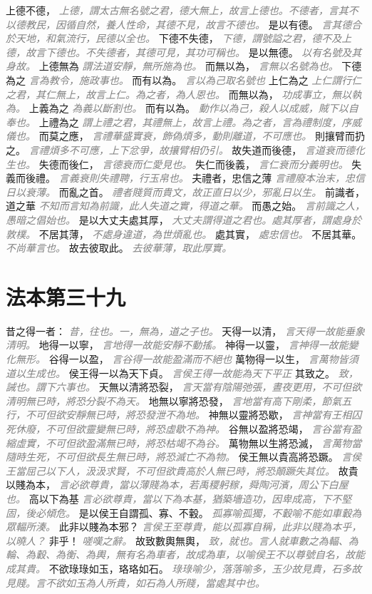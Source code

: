 \documentclass[a4paper,zihao=-4,oneside,landscape,UTF8]{ctexart}
\newcommand{\zhushi}[1]{\scriptsize{\textit{\textcolor{gray}{#1}}}\normalsize}
\begin{document}
上德不德，
\zhushi{上德，謂太古無名號之君，德大無上，故言上德也。不德者，言其不以德教民，因循自然，養人性命，其德不見，故言不德也。}
是以有德。
\zhushi{言其德合於天地，和氣流行，民德以全也。}
下德不失德，
\zhushi{下德，謂號謚之君，德不及上德，故言下德也。不失德者，其德可見，其功可稱也。}
是以無德。
\zhushi{以有名號及其身故。}
上德無為
\zhushi{謂法道安靜，無所施為也。}
而無以為，
\zhushi{言無以名號為也。}
下德為之
\zhushi{言為教令，施政事也。}
而有以為。
\zhushi{言以為己取名號也}
上仁為之
\zhushi{上仁謂行仁之君，其仁無上，故言上仁。為之者，為人恩也。}
而無以為，
\zhushi{功成事立，無以執為。}
上義為之
\zhushi{為義以斷割也。}
而有以為。
\zhushi{動作以為己，殺人以成威，賊下以自奉也。}
上禮為之
\zhushi{謂上禮之君，其禮無上，故言上禮。為之者，言為禮制度，序威儀也。}
而莫之應，
\zhushi{言禮華盛實衰，飾偽煩多，動則離道，不可應也。}
則攘臂而扔之。
\zhushi{言禮煩多不可應，上下忿爭，故攘臂相仍引。}
故失道而後德，
\zhushi{言道衰而德化生也。}
失德而後仁，
\zhushi{言德衰而仁愛見也。}
失仁而後義，
\zhushi{言仁衰而分義明也。}
失義而後禮。
\zhushi{言義衰則失禮聘，行玉帛也。}
夫禮者，忠信之薄
\zhushi{言禮廢本治末，忠信日以衰薄。}
而亂之首。
\zhushi{禮者賤質而貴文，故正直日以少，邪亂日以生。}
前識者，道之華
\zhushi{不知而言知為前識，此人失道之實，得道之華。}
而愚之始。
\zhushi{言前識之人，愚暗之倡始也。}
是以大丈夫處其厚，
\zhushi{大丈夫謂得道之君也。處其厚者，謂處身於敦樸。}
不居其薄，
\zhushi{不處身違道，為世煩亂也。}
處其實，
\zhushi{處忠信也。}
不居其華。
\zhushi{不尚華言也。}
故去彼取此。
\zhushi{去彼華薄，取此厚實。}


\section{法本第三十九}


昔之得一者：
\zhushi{昔，往也。一，無為，道之子也。}
天得一以清，
\zhushi{言天得一故能垂象清明。}
地得一以寧，
\zhushi{言地得一故能安靜不動搖。}
神得一以靈，
\zhushi{言神得一故能變化無形。}
谷得一以盈，
\zhushi{言谷得一故能盈滿而不絕也}
萬物得一以生，
\zhushi{言萬物皆須道以生成也。}
侯王得一以為天下貞。
\zhushi{言侯王得一故能為天下平正}
其致之。
\zhushi{致，誡也。謂下六事也。}
天無以清將恐裂，
\zhushi{言天當有陰陽弛張，晝夜更用，不可但欲清明無已時，將恐分裂不為天。}
地無以寧將恐發，
\zhushi{言地當有高下剛柔，節氣五行，不可但欲安靜無已時，將恐發泄不為地。}
神無以靈將恐歇，
\zhushi{言神當有王相囚死休廢，不可但欲靈變無已時，將恐虛歇不為神。}
谷無以盈將恐竭，
\zhushi{言谷當有盈縮虛實，不可但欲盈滿無已時，將恐枯竭不為谷。}
萬物無以生將恐滅，
\zhushi{言萬物當隨時生死，不可但欲長生無已時，將恐滅亡不為物。}
侯王無以貴高將恐蹶。
\zhushi{言侯王當屈己以下人，汲汲求賢，不可但欲貴高於人無已時，將恐顛蹶失其位。}
故貴以賤為本，
\zhushi{言必欲尊貴，當以薄賤為本，若禹稷躬稼，舜陶河濱，周公下白屋也。}
高以下為基
\zhushi{言必欲尊貴，當以下為本基，猶築墻造功，因卑成高，下不堅固，後必傾危。}
是以侯王自謂孤、寡、不轂。
\zhushi{孤寡喻孤獨，不轂喻不能如車轂為眾輻所湊。}
此非以賤為本邪？
\zhushi{言侯王至尊貴，能以孤寡自稱，此非以賤為本乎，以曉人？}
非乎！
\zhushi{嗟嘆之辭。}
故致數輿無輿，
\zhushi{致，就也。言人就車數之為輻、為輪、為轂、為衡、為輿，無有名為車者，故成為車，以喻侯王不以尊號自名，故能成其貴。}
不欲琭琭如玉，珞珞如石。
\zhushi{琭琭喻少，落落喻多，玉少故見貴，石多故見賤。言不欲如玉為人所貴，如石為人所賤，當處其中也。}
\end{document}
